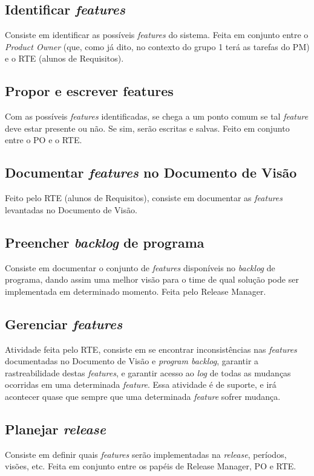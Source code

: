 \subsection{Identificar \emph{features}}
Consiste em identificar as possíveis \emph{features} do sistema. Feita em conjunto entre o \emph{Product Owner} (que, como já dito, no contexto do grupo 1 terá as tarefas do PM) e o RTE (alunos de Requisitos).

\subsection{Propor e escrever features}
Com as possíveis \emph{features} identificadas, se chega a um ponto comum se tal \emph{feature} deve estar presente ou não. Se sim, serão escritas e salvas. Feito em conjunto entre o PO e o RTE.

\subsection{Documentar \emph{features} no Documento de Visão}
Feito pelo RTE (alunos de Requisitos), consiste em documentar as \emph{features} levantadas no Documento de Visão.

\subsection{Preencher \emph{backlog} de programa}
Consiste em documentar o conjunto de \emph{features} disponíveis no \emph{backlog} de programa, dando assim uma melhor visão para o time de qual solução pode ser implementada em determinado momento. Feita pelo Release Manager.

\subsection{Gerenciar \emph{features}}
Atividade feita pelo RTE, consiste em se encontrar inconsistências nas \emph{features} documentadas no Documento de Visão e \emph{program backlog}, garantir a rastreabilidade destas \emph{features}, e garantir acesso ao \emph{log} de todas as mudanças ocorridas em uma determinada \emph{feature}. Essa atividade é de suporte, e irá acontecer quase que sempre que uma determinada \emph{feature} sofrer mudança.

\subsection{Planejar \emph{release}}
Consiste em definir quais \emph{features} serão implementadas na \emph{release}, períodos, visões, etc. Feita em conjunto entre os papéis de Release Manager, PO e RTE.

